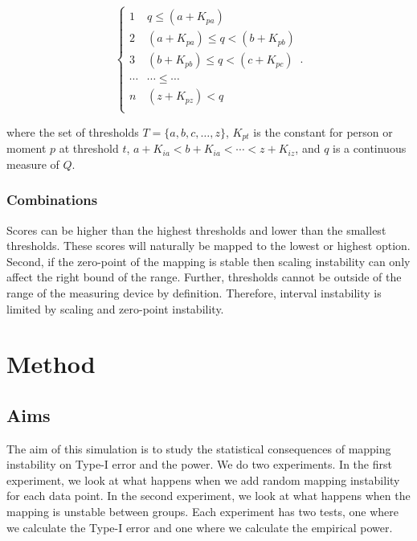 \documentclass[titlepage, a4paper, 11pt]{article}
\begin{document}
\[
\begin{cases} 
    1 & q \leq (a + K_{pa})\\
    2 & (a + K_{pa}) \leq q < (b + K_{pb})\\
    3 & (b + K_{pb}) \leq q < (c + K_{pc})\\
    \cdots & \cdots \leq \cdots\\
    n & (z + K_{pz}) < q\\
\end{cases}.
\]

where the set of thresholds $T = \{a, b, c, \ldots, z\}$, $K_{pt}$ is the constant for person or moment $p$ at threshold $t$, $a + K_{ia} < b + K_{ia} < \cdots < z + K_{iz}$, and $q$ is a continuous measure of $Q$.

\subsubsection{Combinations}
Scores can be higher than the highest thresholds and lower than the smallest thresholds. These scores will naturally be mapped to the lowest or highest option. Second, if the zero-point of the mapping is stable then scaling instability can only affect the right bound of the range. Further, thresholds cannot be outside of the range of the measuring device by definition. Therefore, interval instability is limited by scaling and zero-point instability.

\section{Method}
\subsection{Aims}
The aim of this simulation is to study the statistical consequences of mapping instability on Type-I error and the power. We do two experiments. In the first experiment, we look at what happens when we add random mapping instability for each data point. In the second experiment, we look at what happens when the mapping is unstable between groups. Each experiment has two tests, one where we calculate the Type-I error and one where we calculate the empirical power.
\end{document}
